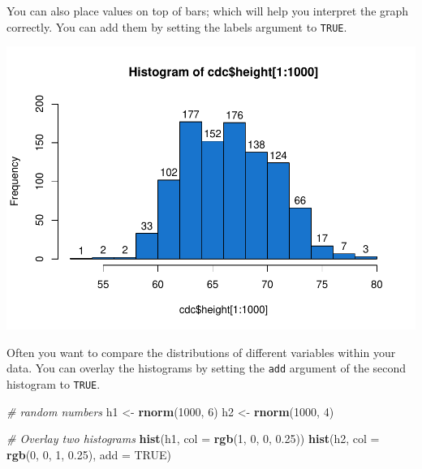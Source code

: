 \documentclass[
]{book}
\newenvironment{Shaded}{\begin{snugshade}}{\end{snugshade}}
\newcommand{\CommentTok}[1]{\textcolor[rgb]{0.56,0.35,0.01}{\textit{#1}}}
\newcommand{\DataTypeTok}[1]{\textcolor[rgb]{0.13,0.29,0.53}{#1}}
\newcommand{\DecValTok}[1]{\textcolor[rgb]{0.00,0.00,0.81}{#1}}
\newcommand{\FloatTok}[1]{\textcolor[rgb]{0.00,0.00,0.81}{#1}}
\newcommand{\KeywordTok}[1]{\textcolor[rgb]{0.13,0.29,0.53}{\textbf{#1}}}
\newcommand{\NormalTok}[1]{#1}
\newcommand{\OperatorTok}[1]{\textcolor[rgb]{0.81,0.36,0.00}{\textbf{#1}}}
\newcommand{\OtherTok}[1]{\textcolor[rgb]{0.56,0.35,0.01}{#1}}
\newcommand{\StringTok}[1]{\textcolor[rgb]{0.31,0.60,0.02}{#1}}
\begin{document}
You can also place values on top of bars; which will help you interpret the graph correctly. You can add them by setting the labels argument to \texttt{TRUE}.

\begin{Shaded}
\end{Shaded}

\includegraphics{_main_files/figure-latex/unnamed-chunk-174-1.pdf}

Often you want to compare the distributions of different variables within your data. You can overlay the histograms by setting the \texttt{add} argument of the second histogram to \texttt{TRUE}.

\begin{Shaded}
\begin{Highlighting}[]
\CommentTok{# random numbers}
\NormalTok{h1 <-}\StringTok{ }\KeywordTok{rnorm}\NormalTok{(}\DecValTok{1000}\NormalTok{, }\DecValTok{6}\NormalTok{)}
\NormalTok{h2 <-}\StringTok{ }\KeywordTok{rnorm}\NormalTok{(}\DecValTok{1000}\NormalTok{, }\DecValTok{4}\NormalTok{)}

\CommentTok{# Overlay two histograms}
\KeywordTok{hist}\NormalTok{(h1, }\DataTypeTok{col =} \KeywordTok{rgb}\NormalTok{(}\DecValTok{1}\NormalTok{, }\DecValTok{0}\NormalTok{, }\DecValTok{0}\NormalTok{, }\FloatTok{0.25}\NormalTok{))}
\KeywordTok{hist}\NormalTok{(h2, }\DataTypeTok{col =} \KeywordTok{rgb}\NormalTok{(}\DecValTok{0}\NormalTok{, }\DecValTok{0}\NormalTok{, }\DecValTok{1}\NormalTok{, }\FloatTok{0.25}\NormalTok{), }\DataTypeTok{add =} \OtherTok{TRUE}\NormalTok{)}
\end{Highlighting}
\end{Shaded}
\end{document}
